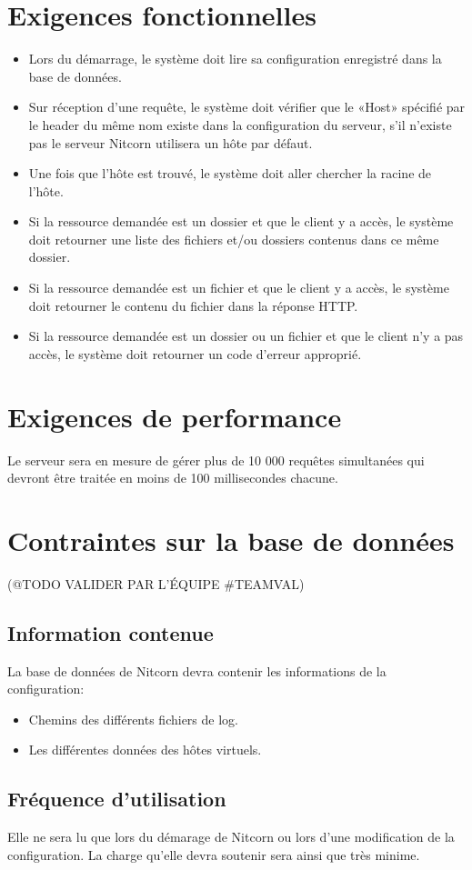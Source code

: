 \documentclass{scrreprt}
\begin{document}
\section{Exigences fonctionnelles}
\begin{itemize}
    \item Lors du démarrage, le système doit lire sa configuration enregistré dans la base de données.
    \item Sur réception d'une requête, le système doit vérifier que le «Host» spécifié par le header du même nom existe dans la configuration du serveur, s'il n'existe pas
        le serveur Nitcorn utilisera un hôte par défaut.
    \item Une fois que l'hôte est trouvé, le système doit aller chercher la racine de l'hôte.
    \item Si la ressource demandée est un dossier et que le client y a accès, le système doit retourner une liste des fichiers et/ou dossiers contenus dans ce même dossier.
    \item Si la ressource demandée est un fichier et que le client y a accès, le système doit retourner le contenu du fichier dans la réponse HTTP.
    \item Si la ressource demandée est un dossier ou un fichier et que le client n'y a pas accès, le système doit retourner un code d'erreur approprié.
\end{itemize}
\section{Exigences de performance} Le serveur sera en mesure de gérer plus de 10 000 requêtes simultanées qui devront être traitée en moins de 100 millisecondes chacune. 
\section{Contraintes sur la base de données}
(@TODO VALIDER PAR L'ÉQUIPE #TEAMVAL)
\subsection{Information contenue}
La base de données de Nitcorn devra contenir les informations de la configuration:
\begin{itemize}
	\item Chemins des différents fichiers de log.
	\item Les différentes données des hôtes virtuels.
\end{itemize}
\subsection{Fréquence d'utilisation}
Elle ne sera lu que lors du démarage de Nitcorn ou lors d'une modification de la configuration.
La charge qu'elle devra soutenir sera ainsi que très minime.
\end{document}
